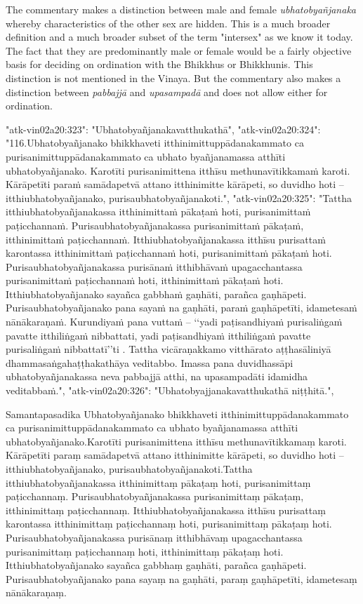 The commentary makes a distinction between male and female {\em ubhatob­yañ­janaka} whereby characteristics of the other sex are hidden. This is a much broader definition and a much broader subset of the term "intersex" as we know it today. The fact that they are predominantly male or female would be a fairly objective basis for deciding on ordination with the Bhikkhus or Bhikkhunis. This distinction is not mentioned in the Vinaya. But the commentary also makes a distinction between {\em pabbajjā} and {\em upasampadā} and does not allow either for ordination.




  "atk-vin02a20:323": "Ubhatobyañjanakavatthukathā",
  "atk-vin02a20:324": "116.Ubhatobyañjanako bhikkhaveti itthinimittuppādanakammato ca purisanimittuppādanakammato ca ubhato byañjanamassa atthīti ubhatobyañjanako. Karotīti purisanimittena itthīsu methunavītikkamaṁ karoti. Kārāpetīti paraṁ samādapetvā attano itthinimitte kārāpeti, so duvidho hoti – itthiubhatobyañjanako, purisaubhatobyañjanakoti.",
  "atk-vin02a20:325": "Tattha itthiubhatobyañjanakassa itthinimittaṁ pākaṭaṁ hoti, purisanimittaṁ paṭicchannaṁ. Purisaubhatobyañjanakassa purisanimittaṁ pākaṭaṁ, itthinimittaṁ paṭicchannaṁ. Itthiubhatobyañjanakassa itthīsu purisattaṁ karontassa itthinimittaṁ paṭicchannaṁ hoti, purisanimittaṁ pākaṭaṁ hoti. Purisaubhatobyañjanakassa purisānaṁ itthibhāvaṁ upagacchantassa purisanimittaṁ paṭicchannaṁ hoti, itthinimittaṁ pākaṭaṁ hoti. Itthiubhatobyañjanako sayañca gabbhaṁ gaṇhāti, parañca gaṇhāpeti. Purisaubhatobyañjanako pana sayaṁ na gaṇhāti, paraṁ gaṇhāpetīti, idametesaṁ nānākaraṇaṁ. Kurundiyaṁ pana vuttaṁ – ‘‘yadi paṭisandhiyaṁ purisaliṅgaṁ pavatte itthiliṅgaṁ nibbattati, yadi paṭisandhiyaṁ itthiliṅgaṁ pavatte purisaliṅgaṁ nibbattatī’’ti . Tattha vicāraṇakkamo vitthārato aṭṭhasāliniyā dhammasaṅgahaṭṭhakathāya veditabbo. Imassa pana duvidhassāpi ubhatobyañjanakassa neva pabbajjā atthi, na upasampadāti idamidha veditabbaṁ.",
  "atk-vin02a20:326": "Ubhatobyajjanakavatthukathā niṭṭhitā.",

Samantapasadika
Ubhatobyañjanako bhikkhaveti itthinimittuppādanakammato ca purisanimittuppādanakammato ca ubhato byañjanamassa atthīti ubhatobyañjanako.Karotīti purisanimittena itthīsu methunavītikkamaṃ karoti. Kārāpetīti paraṃ samādapetvā attano itthinimitte kārāpeti, so duvidho hoti – itthiubhatobyañjanako, purisaubhatobyañjanakoti.Tattha itthiubhatobyañjanakassa itthinimittaṃ pākaṭaṃ hoti, purisanimittaṃ paṭicchannaṃ. Purisaubhatobyañjanakassa purisanimittaṃ pākaṭaṃ, itthinimittaṃ paṭicchannaṃ. Itthiubhatobyañjanakassa itthīsu purisattaṃ karontassa itthinimittaṃ paṭicchannaṃ hoti, purisanimittaṃ pākaṭaṃ hoti. Purisaubhatobyañjanakassa purisānaṃ itthibhāvaṃ upagacchantassa purisanimittaṃ paṭicchannaṃ hoti, itthinimittaṃ pākaṭaṃ hoti. Itthiubhatobyañjanako sayañca gabbhaṃ gaṇhāti, parañca gaṇhāpeti. Purisaubhatobyañjanako pana sayaṃ na gaṇhāti, paraṃ gaṇhāpetīti, idametesaṃ nānākaraṇaṃ. 

